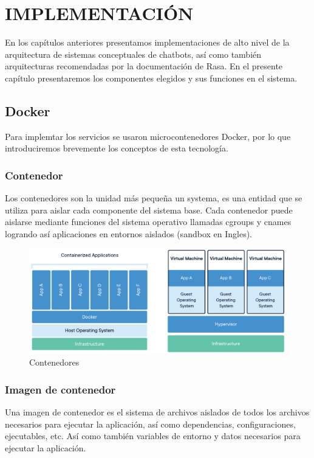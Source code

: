 \chapter[IMPLEMENTACION]{IMPLEMENTACIÓN}
En los capítulos anteriores presentamos implementaciones de alto nivel de la arquitectura de
sistemas conceptuales de chatbots, así como también arquitecturas recomendadas por la documentación
de Rasa. En el presente capítulo presentaremos los componentes elegidos y sus funciones en el
sistema.

\section{Docker}

Para implemtar los servicios se usaron microcontenedores Docker, por lo que introduciremos
brevemente los conceptos de esta tecnología.

\subsection{Contenedor}

Los contenedores son la unidad más pequeña un systema, es una entidad que se utiliza para aislar
cada componente del sistema base. Cada contenedor puede aislarse mediante funciones del sistema
operativo llamadas cgroups y cnames logrando así aplicaciones en entornos aislados (sandbox en
Ingles). \cite{Docker}

\begin{figure}[ht]
	\centering
	\includegraphics[width=\textwidth]{imagenes/cap4/docker-container.png}
	\caption{Contenedores}
	\label{fig:container_diagram}
\end{figure}

\subsection{Imagen de contenedor}

Una imagen de contenedor es el sistema de archivos aislados de todos los archivos necesarios para
ejecutar la aplicación, así como dependencias, configuraciones, ejecutables, etc. Así como también
variables de entorno y datos necesarios para ejecutar la aplicación. \cite{Docker}

